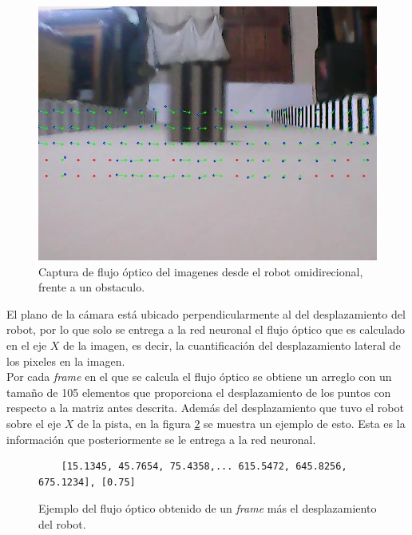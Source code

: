 \documentclass{iccmemoria}
\begin{document}
\begin{figure}[H]
  \centering
  \includegraphics[width = 400pt]{images/travel_2.jpeg}
  \caption[Captura flujo óptico frente a obstaculo.]{Captura de flujo óptico del imagenes desde el robot omidirecional, frente a un obstaculo.}
  \label{fig:travel_2}
\end{figure}

El plano de la cámara está ubicado perpendicularmente al del desplazamiento del robot, por lo que solo se entrega a la red neuronal el flujo óptico que es calculado en el eje $X$ de la imagen, es decir, la cuantificación del desplazamiento lateral de los pixeles en la imagen.\\

Por cada \emph{frame} en el que se calcula el flujo óptico se obtiene un arreglo con un tamaño de 105 elementos que proporciona el desplazamiento de los puntos con respecto a la matriz antes descrita. Además del desplazamiento que tuvo el robot sobre el eje $X$ de la pista, en la figura \ref{fig:optical_flow} se muestra un ejemplo de esto. Esta es la información que posteriormente se le entrega a la red neuronal.\\

\begin{figure}[H]
\centering
\begin{verbatim}
	[15.1345, 45.7654, 75.4358,... 615.5472, 645.8256, 675.1234], [0.75]
\end{verbatim}
\caption[Captura del flujo óptico de un \emph{frame}.]{Ejemplo del flujo óptico obtenido de un \emph{frame} más el desplazamiento del robot.}
  \label{fig:optical_flow}
\end{figure}
\end{document}
